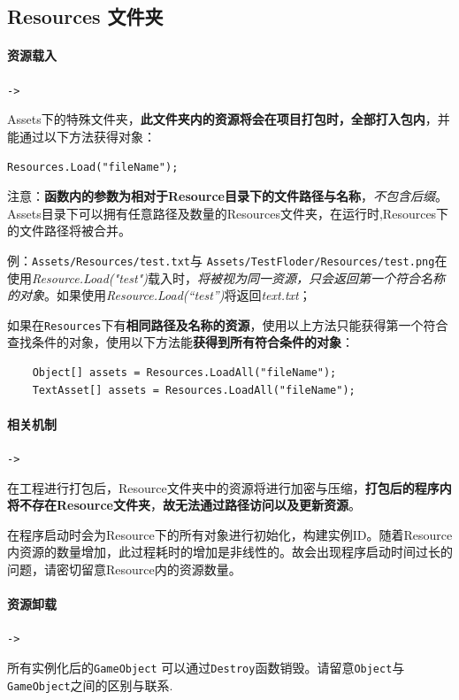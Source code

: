 \documentclass[UTF8,a4paper,12pt]{ctexbook}
\begin{document}
		\subsection{Resources 文件夹}
			\paragraph{资源载入}\verb|->|
			
				Assets下的特殊文件夹，\textbf{此文件夹内的资源将会在项目打包时，全部打入包内}，并能通过以下方法获得对象：

					\verb|Resources.Load("fileName");|
					
		        注意：\textbf{函数内的参数为相对于Resource目录下的文件路径与名称}，\textit{不包含后缀}。Assets目录下可以拥有任意路径及数量的Resources文件夹，在运行时,Resources下的文件路径将被合并。
					
		        例：\verb|Assets/Resources/test.txt|与 \verb|Assets/TestFloder/Resources/test.png|在使用\textit{Resource.Load("test")}载入时，\textit{将被视为同一资源，只会返回第一个符合名称的对象}。如果使用\textit{Resource.Load(“test”)}将返回\textit{text.txt}；
					
		        如果在\verb|Resources|下有\textbf{相同路径及名称的资源}，使用以上方法只能获得第一个符合查找条件的对象，使用以下方法能\textbf{获得到所有符合条件的对象}：
					\begin{lstlisting}
	Object[] assets = Resources.LoadAll("fileName");
	TextAsset[] assets = Resources.LoadAll("fileName");
					\end{lstlisting}
				 		 
			
			\paragraph{相关机制}\verb|->|
				
				在工程进行打包后，Resource文件夹中的资源将进行加密与压缩，\textbf{打包后的程序内将不存在Resource文件夹}，\textbf{故无法通过路径访问以及更新资源}。
				
				在程序启动时会为Resource下的所有对象进行初始化，构建实例ID。随着Resource内资源的数量增加，此过程耗时的增加是非线性的。故会出现程序启动时间过长的问题，请密切留意Resource内的资源数量。

			\paragraph{资源卸载}\verb|->|	
					
				所有实例化后的\verb|GameObject| 可以通过\verb|Destroy|函数销毁。请留意\verb|Object|与\verb|GameObject|之间的区别与联系.
				
\end{document}

